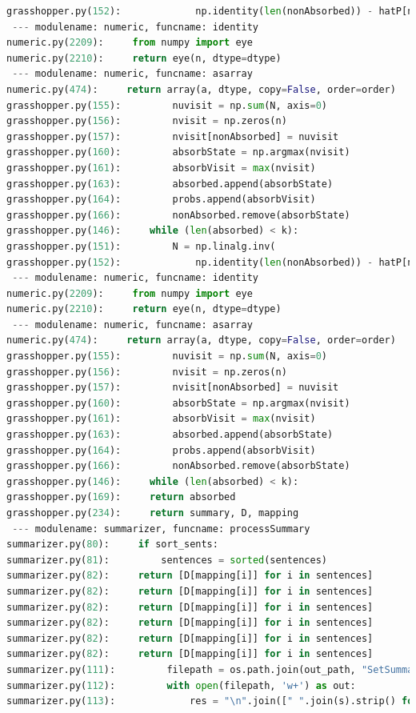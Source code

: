 \documentclass[11pt]{article}
\begin{document}
\begin{lstlisting}[breaklines,language=Python]
grasshopper.py(152):             np.identity(len(nonAbsorbed)) - hatP[nonAbsorbed, nonAbsorbed])
 --- modulename: numeric, funcname: identity
numeric.py(2209):     from numpy import eye
numeric.py(2210):     return eye(n, dtype=dtype)
 --- modulename: numeric, funcname: asarray
numeric.py(474):     return array(a, dtype, copy=False, order=order)
grasshopper.py(155):         nuvisit = np.sum(N, axis=0)
grasshopper.py(156):         nvisit = np.zeros(n)
grasshopper.py(157):         nvisit[nonAbsorbed] = nuvisit
grasshopper.py(160):         absorbState = np.argmax(nvisit)
grasshopper.py(161):         absorbVisit = max(nvisit)
grasshopper.py(163):         absorbed.append(absorbState)
grasshopper.py(164):         probs.append(absorbVisit)
grasshopper.py(166):         nonAbsorbed.remove(absorbState)
grasshopper.py(146):     while (len(absorbed) < k):
grasshopper.py(151):         N = np.linalg.inv(
grasshopper.py(152):             np.identity(len(nonAbsorbed)) - hatP[nonAbsorbed, nonAbsorbed])
 --- modulename: numeric, funcname: identity
numeric.py(2209):     from numpy import eye
numeric.py(2210):     return eye(n, dtype=dtype)
 --- modulename: numeric, funcname: asarray
numeric.py(474):     return array(a, dtype, copy=False, order=order)
grasshopper.py(155):         nuvisit = np.sum(N, axis=0)
grasshopper.py(156):         nvisit = np.zeros(n)
grasshopper.py(157):         nvisit[nonAbsorbed] = nuvisit
grasshopper.py(160):         absorbState = np.argmax(nvisit)
grasshopper.py(161):         absorbVisit = max(nvisit)
grasshopper.py(163):         absorbed.append(absorbState)
grasshopper.py(164):         probs.append(absorbVisit)
grasshopper.py(166):         nonAbsorbed.remove(absorbState)
grasshopper.py(146):     while (len(absorbed) < k):
grasshopper.py(169):     return absorbed
grasshopper.py(234):     return summary, D, mapping
 --- modulename: summarizer, funcname: processSummary
summarizer.py(80):     if sort_sents:
summarizer.py(81):         sentences = sorted(sentences)
summarizer.py(82):     return [D[mapping[i]] for i in sentences]
summarizer.py(82):     return [D[mapping[i]] for i in sentences]
summarizer.py(82):     return [D[mapping[i]] for i in sentences]
summarizer.py(82):     return [D[mapping[i]] for i in sentences]
summarizer.py(82):     return [D[mapping[i]] for i in sentences]
summarizer.py(82):     return [D[mapping[i]] for i in sentences]
summarizer.py(111):         filepath = os.path.join(out_path, "SetSummary.{}.txt".format(setID))
summarizer.py(112):         with open(filepath, 'w+') as out:
summarizer.py(113):             res = "\n".join([" ".join(s).strip() for s in summary])

\end{lstlisting}
\end{document}
